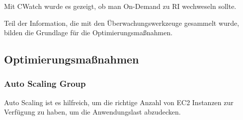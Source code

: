 Mit CWatch wurde es gezeigt, ob man On-Demand zu RI wechweseln sollte.


Teil der Information, die mit den Überwachungswerkzeuge gesammelt wurde, bilden die Grundlage für die Optimierungsmaßnahmen.


\subsection{Optimierungsmaßnahmen}

\subsubsection{Auto Scaling Group }
Auto Scaling ist es hilfreich, um die richtige Anzahl von EC2 Instanzen zur Verfügung zu haben, um die Anwendungslast abzudecken.
\\\\

